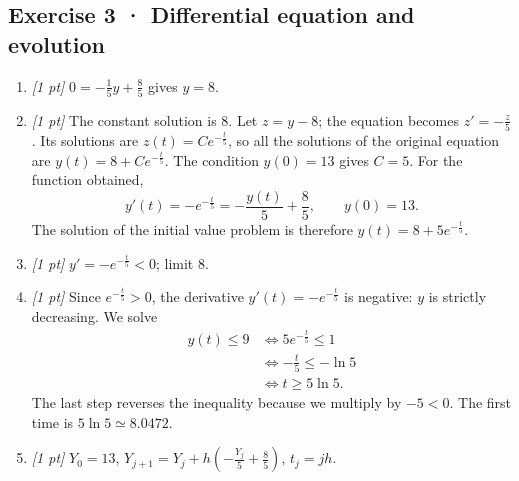 \subsection*{Exercise 3 · Differential equation and evolution}\begin{enumerate}

\item \textit{[1 pt]} $0=-\frac{1}{5}y+\frac{8}{5}$ gives $y=8$.

\item \textit{[1 pt]} The constant solution is $8$. Let $z=y-8$; the equation becomes $z'=-\frac{z}{5}$. Its solutions are $z(t)=Ce^{-\frac{t}{5}}$, so all the solutions of the original equation are $y(t)=8+Ce^{-\frac{t}{5}}$.
The condition $y(0)=13$ gives $C=5$. For the function obtained,
\[y'(t)=-e^{-\frac{t}{5}}=-\frac{y(t)}{5}+\frac{8}{5},\qquad y(0)=13.\]
The solution of the initial value problem is therefore $y(t)=8+5e^{-\frac{t}{5}}$.

\item \textit{[1 pt]} $y'=-e^{-\frac{t}{5}}<0$; limit $8$.

\item \textit{[1 pt]} Since $e^{-\frac{t}{5}}>0$, the derivative $y'(t)=-e^{-\frac{t}{5}}$ is negative: $y$ is strictly decreasing. We solve
\[\begin{aligned}y(t)\le 9&\Longleftrightarrow 5e^{-\frac{t}{5}}\le1\\&\Longleftrightarrow -\frac{t}{5}\le-\ln 5\\&\Longleftrightarrow t\ge 5\ln 5.\end{aligned}\]
The last step reverses the inequality because we multiply by $-5<0$. The first time is $5\ln 5\simeq\num{8,0472}$.

\item \textit{[1 pt]} $Y_0=13$, $Y_{j+1}=Y_j+h(-\frac{Y_j}{5}+\frac{8}{5})$, $t_j=jh$.

\end{enumerate}

